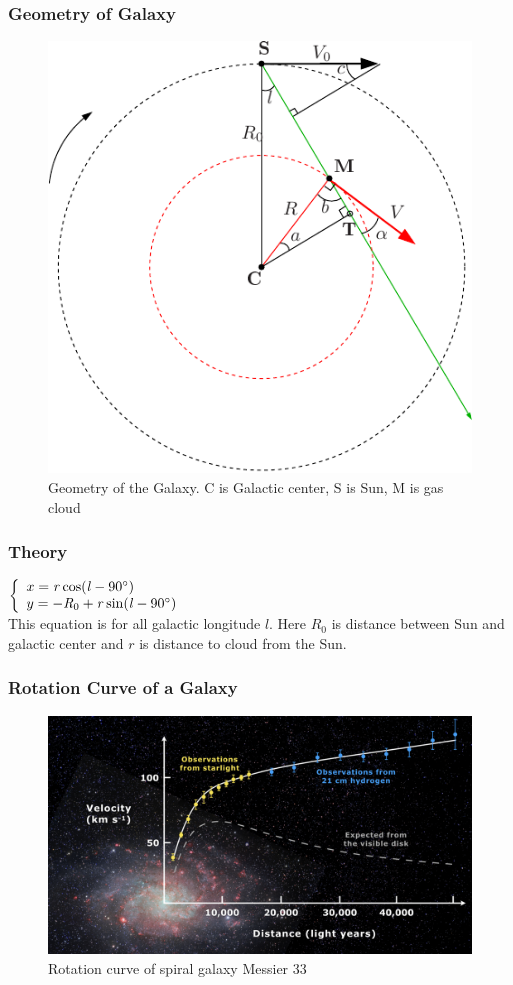 \documentclass{beamer}
\begin{document}
\begin{frame}
\frametitle{Geometry of Galaxy}
\begin{figure}
\caption{Geometry of the Galaxy. C is Galactic center, S is Sun, M is gas cloud}
\includegraphics[width=0.5\linewidth]{galgeom}
\end{figure}
\end{frame}


\begin{frame}
\frametitle{Theory}
\begin{theorem}
$ \left\lbrace
\begin{array}{l}
	x=\mathit{r} \cos (\mathit{l}-90\degree) \\
	y=-\mathit{R}_{0}+\mathit{r} \sin (\mathit{l}-90\degree) \\
\end{array}
\right.$\\
This equation is for all galactic longitude $\mathit{l}$. Here $\mathit{R}_{0}$ is distance between Sun and galactic center and $\mathit{r}$ is distance to cloud from the Sun.
\end{theorem}
\end{frame}


\begin{frame}
\frametitle{Rotation Curve of a Galaxy}
\begin{figure}
\caption{Rotation curve of spiral galaxy Messier 33}
\includegraphics[width=0.8\linewidth]{rotcurve}
\end{figure}
\end{frame}
\end{document}
